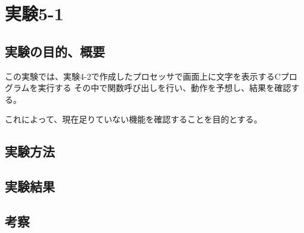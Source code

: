 \section{実験5-1}
\subsection{実験の目的、概要}
この実験では、実験4-2で作成したプロセッサで画面上に文字を表示するCプログラムを実行する
その中で関数呼び出しを行い、動作を予想し、結果を確認する。

これによって、現在足りていない機能を確認することを目的とする。

\subsection{実験方法}

\subsection{実験結果}

\subsection{考察}
